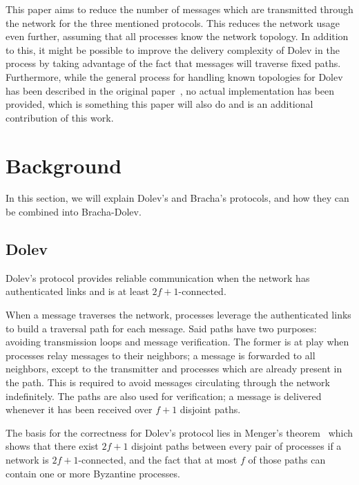 

This paper aims to reduce the number of messages which are transmitted through the network for the three mentioned protocols. This reduces the network usage even further, assuming that all processes know the network topology. In addition to this, it might be possible to improve the delivery complexity of Dolev in the process by taking advantage of the fact that messages will traverse fixed paths. Furthermore, while the general process for handling known topologies for Dolev has been described in the original paper~\cite{dolev}, no actual implementation has been provided, which is something this paper will also do and is an additional contribution of this work.


\section{Background}
\label{background}
In this section, we will explain Dolev's and Bracha's protocols, and how they can be combined into Bracha-Dolev.

\subsection*{Dolev}
Dolev's protocol provides reliable communication when the network has authenticated links and is at least $2f+1$-connected.

When a message traverses the network, processes leverage the authenticated links to build a traversal path for each message. Said paths have two purposes: avoiding transmission loops and message verification. 
The former is at play when processes relay messages to their neighbors; a message is forwarded to all neighbors, except to the transmitter and processes which are already present in the path. This is required to avoid messages circulating through the network indefinitely.
The paths are also used for verification; a message is delivered whenever it has been received over $f+1$ disjoint paths.

The basis for the correctness for Dolev's protocol lies in Menger's theorem~\cite{menger} which shows that there exist $2f+1$ disjoint paths between every pair of processes if a network is $2f+1$-connected, and the fact that at most $f$ of those paths can contain one or more Byzantine processes. 

